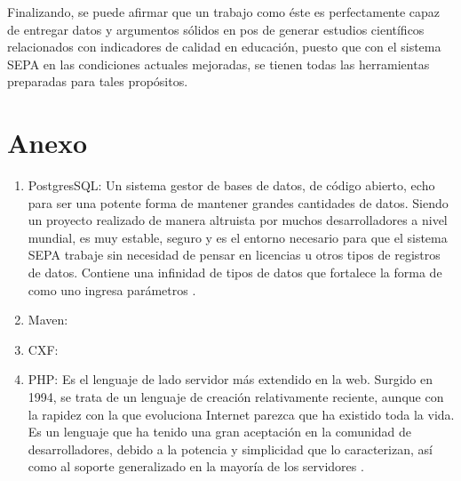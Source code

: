\documentclass[a4paper,12pt,openany,oneside]{book}
\begin{document}
Finalizando, se puede afirmar que un trabajo como éste es perfectamente capaz de entregar datos y argumentos sólidos en pos de generar estudios científicos relacionados con indicadores de calidad en educación, puesto que con el sistema SEPA en las condiciones actuales mejoradas, se tienen todas las herramientas preparadas para tales propósitos. 
\chapter{Anexo}
\begin{enumerate}
        \item PostgresSQL: Un sistema gestor de bases de datos, de código abierto, echo para ser una potente forma de mantener grandes cantidades de datos. Siendo un proyecto realizado de manera altruista por muchos desarrolladores a nivel mundial, es muy estable, seguro y es el entorno necesario para que el sistema SEPA trabaje sin necesidad de pensar en licencias u otros tipos de registros de datos. Contiene una infinidad de tipos de datos que fortalece la forma de como uno ingresa parámetros \cite{data18}.
        \item Maven:
        \item CXF: 
        \item PHP: Es el lenguaje de lado servidor más extendido en la web. Surgido en 1994, se trata de un lenguaje de creación relativamente reciente, aunque con la rapidez con la que evoluciona Internet parezca que ha existido toda la vida. Es un lenguaje que ha tenido una gran aceptación en la comunidad de desarrolladores, debido a la potencia y simplicidad que lo caracterizan, así como al soporte generalizado en la mayoría de los servidores \cite{data7}.
\end{enumerate}


\end{document}
